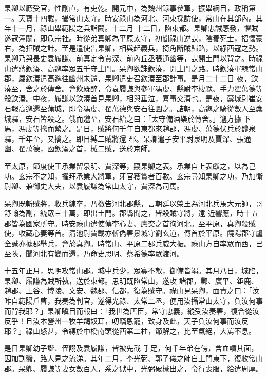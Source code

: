 \begin{pinyinscope}
 杲卿以廕受官，性剛直，有吏乾。開元中，為魏州錄事參軍，振舉綱目，政稱第一。天寶十四載，攝常山太守。時安祿山為河北、河東採訪使，常山在其部內。其年十一月，祿山舉範陽之兵詣闕。十二月
 十二日，陷東都。杲卿忠誠感發，懼賊遂寇潼關，即危宗社。時從弟真卿為平原太守，初聞祿山逆謀，陰養死士，招懷豪右，為拒賊之計。至是遣使告杲卿，相與起義兵，掎角斷賊歸路，以紓西寇之勢。杲卿乃與長史袁履謙、前真定令賈深、前內丘丞張通幽等，謀開土門以背之。時祿山遣蔣欽湊、高邈率眾五千守土門。杲卿欲誅欽湊，開土門之路。時欽湊軍隸常山郡，屬欽湊遣高邈往幽州未還，杲卿遣吏召欽湊至郡計事。是月二十二日
 夜，欽湊至，舍之於傳舍。會飲既醉，令袁履謙與參軍馮虔、縣尉李棲默、手力翟萬德等殺欽湊。中夜，履謙以欽湊首見杲卿，相與垂泣，喜事交濟也。是夜，稾城尉崔安石報高邈還至蒲城，即令馮虔、翟萬德與安石往圖之。詰朝，高邈之騎從數人至稾城驛，安石皆殺之。俄而邈至，安石紿之曰：「太守備酒樂於傳舍。」邈方據下馬，馮虔等擒而縶之。是日，賊將何千年自東都來趙郡，馮虔、萬德伏兵於醴泉驛，千年至，又擒之。即日縛二賊將還
 郡。杲卿遣子安平尉泉明及賈深、張通幽、翟萬德，函欽湊之首，械二賊，送於京師。



 至太原，節度使王承業留泉明、賈深等，寢杲卿之表。承業自上表獻之，以為己功。玄宗不之知，擢拜承業大將軍，牙官獲賞者百數。玄宗尋知杲卿之功，乃加衛尉卿、兼御史大夫，以袁履謙為常山太守，賈深為司馬。



 杲卿既斬賊將，收兵練卒，乃檄告河北郡縣，言朝廷以榮王為河北兵馬大元帥，哥舒翰為副，統眾三十萬，即出土門。郡縣聞之，皆殺賊守將，遠
 近響應，時十五郡皆為國家所守。時安祿山遣使傳李心妻、盧奕之首徇河北。至平原，真卿殺賊使，收藏心妻等首。清池尉賈載亦斬偽署景城守劉玄道，傳首於平原。饒陽郡守盧全誠亦據郡舉兵，會於真卿。時常山、平原二郡兵威大振。祿山方自率眾而西，已至陜，聞河北有變而還，乃命史思明、蔡希德率眾渡河。



 十五年正月，思明攻常山郡。城中兵少，眾寡不敵，御備皆竭。其月八日，城陷，杲卿、履謙為賊所執，送於東都。思明既陷常山，遂攻
 諸郡，鄴、廣平、鉅鹿、趙郡、上谷、博陵、文安、魏郡、信都，復為賊守。祿山見杲卿，面責之曰：「汝昨自範陽戶曹，我奏為判官，遂得光祿、太常二丞，便用汝攝常山太守，負汝何事而背我耶？」杲卿瞋目而報曰：「我世為唐臣，常守忠義，縱受汝奏署，復合從汝反乎！且汝本營州一牧羊羯奴耳，叨竊恩寵，致身及此，天子負汝何事而汝反耶？」祿山怒甚，令縛於中橋南頭從西第二柱，節解之，比至氣絕，大罵不息。



 是日杲卿幼子誕、侄詡及袁履謙，皆被先截
 手足，何千年弟在傍，含血噴其面，因加割臠，路人見之流涕。其年二月，李光弼、郭子儀之師自土門東下，復收常山郡。杲卿、履謙等妻女數百人，系之獄中，光弼破械出之，令行喪服，給遣周厚。




\end{pinyinscope}
